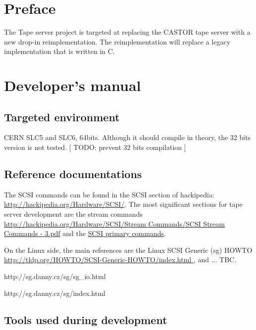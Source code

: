 \chapter*{Preface}

The Tape server project is targeted at replacing the CASTOR tape server with a new drop-{}in reimplementation. The reimplementation will replace a legacy implementation that is written in C.


\chapter{Developer's manual}

\section{Targeted environment}

CERN SLC5 and SLC6, 64bits. Although it should compile in theory, the 32 bits version is not tested. [ TODO: prevent 32 bits compilation ]

\section{Reference documentations}

The SCSI commands can be found in the SCSI section of hackipedia:
 \href{http://hackipedia.org/Hardware/SCSI/}{http://hackipedia.org/Hardware/SCSI/}. 
The most significant sections for tape server development are the stream commands
 \href{http://hackipedia.org/Hardware/SCSI/Stream%20Commands/SCSI%20Stream%20Commands%20-%203.pdf}{
    http://hackipedia.org/Hardware/SCSI/Stream Commands/SCSI Stream Commands - 3.pdf} and the 
\href{http://hackipedia.org/Hardware/SCSI/Primary%20Commands/SCSI%20Primary%20Commands%20-%204.pdf}{SCSI primary commands}.

On the Linux side, the main references are the Linux SCSI Generic (sg) HOWTO 
 \href{http://tldp.org/HOWTO/SCSI-Generic-HOWTO/index.html}{  http://tldp.org/\-HOWTO/\-SCSI-{}Generic-{}HOWTO/\-index.html  }    , and ... TBC.

http://sg.danny.cz/sg/sg\_io.html

http://sg.danny.cz/sg/index.html

\section{Tools used during development}

